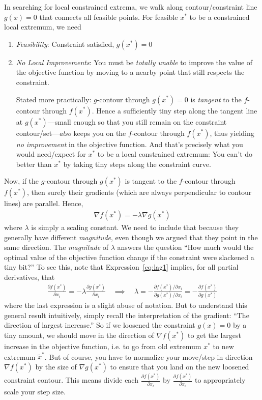 \documentclass[12pt]{article}
\numberwithin{equation}{section} %
\theoremstyle{plain}
\theoremstyle{definition}
\theoremstyle{remark}
\begin{document}
In searching for local constrained extrema, we walk along
contour/constraint line $g(x)=0$ that connects all feasible points.  For
feasible $x^*$ to be a constrained local extremum, we need
\begin{enumerate}[label=(\roman*)]
  \item \emph{Feasibility}: Constraint satisfied, $g(x^*)=0$
  \item \emph{No Local Improvements}:
    You must be \emph{totally unable} to improve the value of the
    objective function by moving to a nearby point that still respects
    the constraint.

    Stated more practically: $g$-contour through $g(x^*)=0$ is
    \emph{tangent} to the $f$-contour through $f(x^*)$.
    Hence a sufficiently tiny step along the tangent line at
    $g(x^*)$---small enough so that you still remain on the constraint
    contour/set---\emph{also} keeps you on the $f$-contour
    through $f(x^*)$, thus yielding \emph{no improvement} in the
    objective function. And that's precisely what you would need/expect
    for $x^*$ to be a local constrained extremum:
    You can't do better than $x^*$ by taking tiny steps along the
    constraint curve.
\end{enumerate}
Now, if the $g$-contour through $g(x^*)$ is tangent to the $f$-contour
through $f(x^*)$, then surely their gradients (which are always
perpendicular to contour lines) are parallel. Hence,
\begin{align}
  \nabla f(x^*) = -\lambda \nabla g(x^*)
  \label{eq:lag1}
\end{align}
where $\lambda$ is simply a scaling constant. We need to include that
because they generally have different \emph{magnitude}, even though we
argued that they point in the same direction.
The \emph{magnitude} of $\lambda$ answers the question
``How much would the optimal value of the objective function change if
the constraint were slackened a tiny bit?''
To see this, note that Expression~\ref{eq:lag1} implies, for all partial
derivatives, that
\begin{align}
  \frac{\partial f(x^*)}{\partial x_i}
  = -\lambda \frac{\partial g(x^*)}{\partial x_i}
  \quad\implies\quad
  \lambda
  = -\frac{\partial f(x^*)/\partial x_i}{\partial g(x^*)/\partial x_i}
  = -\frac{\partial f(x^*)}{\partial g(x^*)}
\end{align}
where the last expression is a slight abuse of notation.
But to understand this general result intuitively, simply recall the
interpretation of the gradient: ``The direction of largest increase.''
So if we loosened the constraint $g(x)=0$ by a tiny amount,
we should move in the direction of $\nabla f(x^*)$ to get the largest
increase in the objective function, i.e. to go from old extremum $x^*$
to new extremum $\tilde{x}^*$.
But of course, you have to normalize your move/step in direction
$\nabla f(x^*)$ by the size of $\nabla g(x^*)$ to ensure that you land
on the new loosened constraint contour.
This means divide each $\frac{\partial f(x^*)}{\partial x_i}$ by
$\frac{\partial f(x^*)}{\partial x_i}$ to appropriately scale your step
size.
\end{document}
